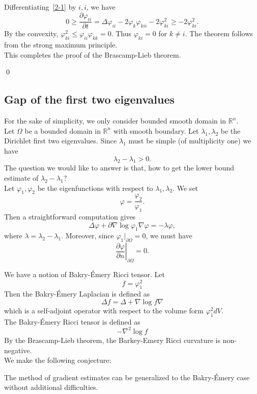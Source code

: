 Differentiating~\eqref{2-1}  by $i,i$, we have
\[
0 \geqslant \frac{\partial\varphi_{ii}}{\partial t} = \Delta\varphi_{ii} - 
2\varphi_k\varphi_{kii} - 2\varphi_{ki}^2 \geqslant -2\varphi_{ki}^2.
\]
By the convexity, $\varphi_{ki}^2 \leqslant \varphi_{ii}\varphi_{kk} = 0$. Thus
$\varphi_{ki} = 0$ for $k\neq i$. The theorem follows from the strong maximum
principle.
\\

This completes the proof of the Brascamp-Lieb theorem.

\qed

\subsection{Gap of the first two eigenvalues}

For the sake of simplicity, we only consider bounded smooth domain in 
$\mathbb{R}^n$.
\\

Let $\Omega$ be a bounded domain in $\mathbb{R}^n$ with smooth boundary. Let
$\lambda_1, \lambda_2$ be the Dirichlet first two eigenvalues. Since $\lambda_1$
must be simple (of multiplicity one) we have
\[
\lambda_2 - \lambda_1> 0.
\]
The question we would like to answer is that, how to get the lower bound 
estimate of $\lambda_2 - \lambda_1$?
\\

Let $\varphi_1, \varphi_2$ be the eigenfunctions with respect to 
$\lambda_1, \lambda_2$. We set
\[
\varphi = \frac{\varphi_2}{\varphi_1}.
\]
Then a straightforward computation gives
\[
\Delta\varphi + \partial\nabla\log\varphi_1\nabla\varphi = -\lambda\varphi,
\]
where $\lambda = \lambda_2 - \lambda_1$. Moreover, since 
$\varphi_1|_{\partial\Omega} = 0$, we must have
\[
\left.\frac{\partial\varphi}{\partial n}\right|_{\partial\Omega} = 0.
\]

We have a notion of Bakry-\'Emery Ricci tensor. Let
\[
f = \varphi_1^2
\]
Then the Bakry-\'Emery Laplacian is defined as
\[
\Delta f = \Delta + \nabla\log f\nabla
\]
which is a self-adjoint operator with respect to the volume form 
$\varphi_1^2 dV$.
\\

The Bakry-\'Emery Ricci tensor is defined as
\[
-\nabla^2 \log f
\]
By the Brascamp-Lieb theorem, the Barkey-Emery Ricci curvature is non-negative.
\\

We make the following conjecture:
\begin{conjecture}
The method of gradient estimates can be generalized to the Bakry-\'Emery case
without additional difficulties.
\end{conjecture}

